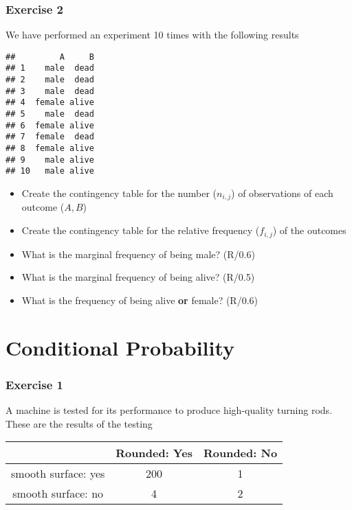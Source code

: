 \documentclass[
]{book}
\providecommand{\tightlist}{%
  \setlength{\itemsep}{0pt}\setlength{\parskip}{0pt}}
\begin{document}
\hypertarget{exercise-2-1}{%
\subsubsection{Exercise 2}\label{exercise-2-1}}

We have performed an experiment 10 times with the following results

\begin{verbatim}
##         A     B
## 1    male  dead
## 2    male  dead
## 3    male  dead
## 4  female alive
## 5    male  dead
## 6  female alive
## 7  female  dead
## 8  female alive
## 9    male alive
## 10   male alive
\end{verbatim}

\begin{itemize}
\tightlist
\item
  Create the contingency table for the number (\(n_{i,j}\)) of observations of each outcome (\(A,B\))
\item
  Create the contingency table for the relative frequency (\(f_{i,j}\)) of the outcomes
\item
  What is the marginal frequency of being male? (R/0.6)
\item
  What is the marginal frequency of being alive? (R/0.5)
\item
  What is the frequency of being alive \textbf{or} female? (R/0.6)
\end{itemize}

\hypertarget{conditional-probability-3}{%
\section{Conditional Probability}\label{conditional-probability-3}}

\hypertarget{exercise-1-2}{%
\subsubsection{Exercise 1}\label{exercise-1-2}}

A machine is tested for its performance to produce high-quality turning rods. These are the results of the testing

\begin{longtable}[]{@{}ccc@{}}
\toprule
& Rounded: Yes & Rounded: No \\
\midrule
\endhead
smooth surface: yes & 200 & 1 \\
smooth surface: no & 4 & 2 \\
\bottomrule
\end{longtable}
\end{document}
